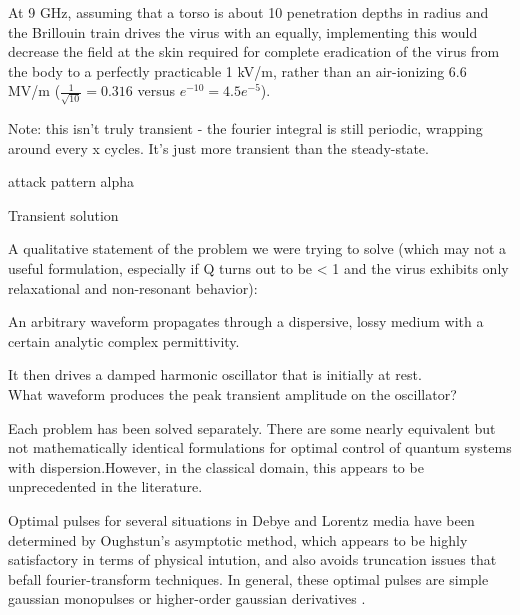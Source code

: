 \documentclass[paper.tex]{subfiles}
\begin{document}
At 9 GHz, assuming that a torso is about 10 penetration depths in radius and the Brillouin train 
drives the virus with an equally, implementing this would decrease the field at the skin required 
for complete eradication of the virus from the body to a perfectly practicable 1 kV/m, rather than 
an air-ionizing 6.6 MV/m ($\frac{1}{\sqrt{10}}=0.316$ versus $e^{-10}=4.5e^{-5}$). 







Note: this isn't truly transient - the fourier integral is still periodic, wrapping around every x cycles. It's just more transient than the steady-state.




attack pattern alpha


Transient solution

\pagebreak
A qualitative statement of the problem we were trying to solve (which may not a useful formulation, especially if Q turns out to be < 1 and the virus exhibits only relaxational and non-resonant behavior):

\begin{toolchain}
An arbitrary waveform propagates through a dispersive, lossy medium with a certain analytic complex 
permittivity. 

It then drives a damped harmonic oscillator that is initially at rest.\\

What waveform produces the peak transient amplitude on the oscillator?
\end{toolchain}


Each problem has been solved separately. There are some nearly equivalent but not mathematically identical formulations for optimal control of quantum systems with dispersion.\footnotemark However, in the classical domain, this appears to be unprecedented in the literature.




Optimal pulses for several situations in Debye and Lorentz media have been determined by Oughstun's asymptotic method, which appears to be highly satisfactory in terms of physical intution, and also avoids truncation issues that befall fourier-transform techniques. In general, these optimal pulses are simple gaussian monopulses or higher-order gaussian derivatives \cite{Optimal2017} \cite{Optimal2015}. 
\end{document}
